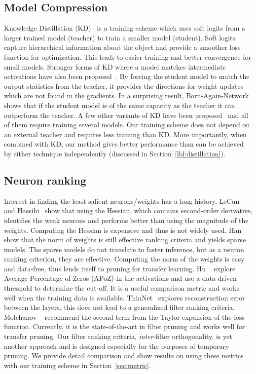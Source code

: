 \subsection{Model Compression } 
Knowledge Distillation (KD)~\cite{Hinton2015DistillingTK} is a training scheme which uses soft logits from a larger trained model (teacher) to train a smaller model (student).
Soft logits capture hierarchical information about the object and provide a smoother loss function for optimization. This leads to easier training and better convergence for small models.
Stronger forms of KD where a model matches intermediate activations have also been proposed~\cite{Romero2014FitNetsHF}. 
By forcing the student model to match the output statistics from the teacher, it provides the directions for weight updates which are not found in the gradients.
In a surprising result, Born-Again-Network~\cite{Furlanello2018BornAN} shows that if the student model is of the same capacity as the teacher it can outperform the teacher.
A few other variants of KD have been proposed~\cite{Romero2014FitNetsHF} and all of them require training several models.
Our training scheme does not depend on an external teacher and requires less training than KD. %
More importantly, when combined with KD, our method gives better performance than can be achieved by either technique independently (discussed in Section~\ref{lbl:distillation}).


\subsection{Neuron ranking }
Interest in finding the least salient neurons/weights has a long history. 
LeCun~\cite{LeCun1989OptimalBD} and Hassibi\etal~\cite{Hassibi1992SecondOD} show that using the Hessian, which contains second-order derivative, identifies the weak neurons and performs better than using the magnitude of the weights.
Computing the Hessian is expensive and thus is not widely used.
Han \etal~\cite{Han2015DeepCC} show that the norm of weights is still effective ranking criteria and yields sparse models.
The sparse models do not translate to faster inference, but as a neuron ranking criterion, they are effective.
Computing the norm of the weights is easy and data-free, thus lends itself to pruning for transfer learning.
Hu \etal~\cite{Hu2016NetworkTA} explore Average Percentage of Zeros (APoZ) in the activations and use a data-driven threshold to determine the cut-off. 
It is a useful comparison metric and works well when the training data is available.
ThinNet~\cite{Luo2017ThiNetAF} explores reconstruction error between the layers, this does not lead to a generalized filter ranking criteria.
Molchanov \etal~\cite{Molchanov2016PruningCN} recommend the second term from the Taylor expansion of the loss function.%
Currently, it is the state-of-the-art in filter pruning and works well for transfer pruning.
Our filter ranking criteria, \textit{inter}-filter orthogonality, is yet another approach and is designed especially for the purposes of temporary pruning. 
We provide detail comparison and show results on using these metrics with our training scheme in Section~\ref{sec:metric}.


